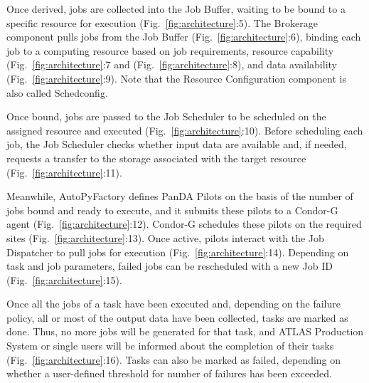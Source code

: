 Once derived, jobs are collected into the Job Buffer, waiting to be bound to a
specific resource for execution (Fig.~\ref{fig:architecture}:5). The Brokerage
component pulls jobs from the Job Buffer (Fig.~\ref{fig:architecture}:6),
binding each job to a computing resource based on job requirements, resource
capability (Fig.~\ref{fig:architecture}:7 and (Fig.~\ref{fig:architecture}:8),
and data availability (Fig.~\ref{fig:architecture}:9). Note that the Resource
Configuration component is also called Schedconfig.

Once bound, jobs are passed to the Job Scheduler to be scheduled on the
assigned resource and executed (Fig.~\ref{fig:architecture}:10). Before
scheduling each job, the Job Scheduler checks whether input data are available
and, if needed, requests a transfer to the storage associated with the target
resource (Fig.~\ref{fig:architecture}:11).

Meanwhile, AutoPyFactory defines PanDA Pilots on the basis of the number of
jobs bound and ready to execute, and it submits these pilots to a Condor-G
agent (Fig.~\ref{fig:architecture}:12). Condor-G schedules these pilots on the
required sites (Fig.~\ref{fig:architecture}:13). Once active, pilots interact
with the Job Dispatcher to pull jobs for execution
(Fig.~\ref{fig:architecture}:14). Depending on task and job parameters, failed
jobs can be rescheduled with a new Job ID (Fig.~\ref{fig:architecture}:15).

Once all the jobs of a task have been executed and, depending on the failure
policy, all or most of the output data have been collected, tasks are marked as
done. Thus, no more jobs will be generated for that task, and ATLAS Production
System or single users will be informed about the completion of their tasks
(Fig.~\ref{fig:architecture}:16). Tasks can also be marked as failed, depending
on whether a user-defined threshold for number of failures has been exceeded.



